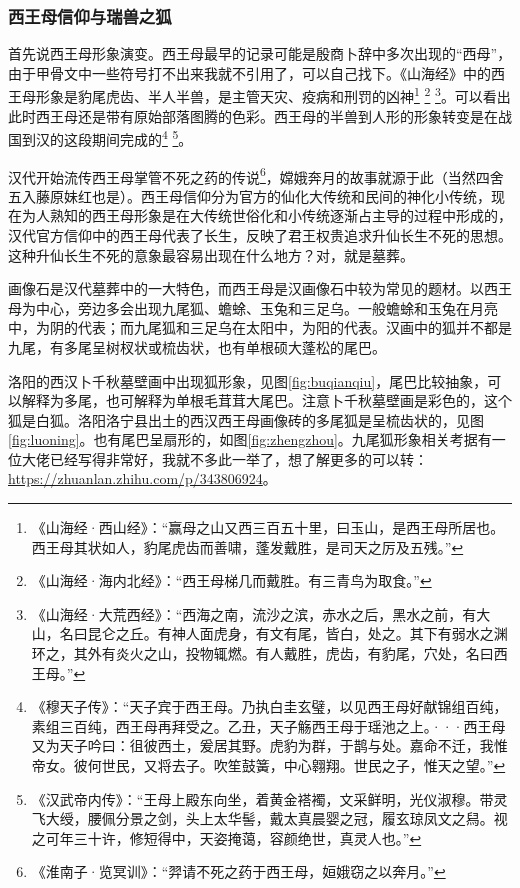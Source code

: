 \documentclass[UTF8, 12pt, A4paper]{article}
\begin{document}
\subsubsection{西王母信仰与瑞兽之狐}

首先说西王母形象演变。西王母最早的记录可能是殷商卜辞中多次出现的“西母”，由于甲骨文中一些符号打不出来我就不引用了，可以自己找下。《山海经》中的西王母形象是豹尾虎齿、半人半兽，是主管天灾、疫病和刑罚的凶神\footnote{《山海经·西山经》：“赢母之山又西三百五十里，曰玉山，是西王母所居也。西王母其状如人，豹尾虎齿而善啸，蓬发戴胜，是司天之厉及五残。”} \footnote{《山海经·海内北经》：“西王母梯几而戴胜。有三青鸟为取食。”} \footnote{《山海经·大荒西经》：“西海之南，流沙之滨，赤水之后，黑水之前，有大山，名曰昆仑之丘。有神人面虎身，有文有尾，皆白，处之。其下有弱水之渊环之，其外有炎火之山，投物辄燃。有人戴胜，虎齿，有豹尾，穴处，名曰西王母。”}。可以看出此时西王母还是带有原始部落图腾的色彩。西王母的半兽到人形的形象转变是在战国到汉的这段期间完成的\footnote{《穆天子传》：“天子宾于西王母。乃执白圭玄璧，以见西王母好献锦组百纯，素组三百纯，西王母再拜受之。乙丑，天子觞西王母于瑶池之上。···西王母又为天子吟曰：徂彼西土，爰居其野。虎豹为群，于鹊与处。嘉命不迁，我惟帝女。彼何世民，又将去子。吹笙鼓簧，中心翱翔。世民之子，惟天之望。”} \footnote{《汉武帝内传》：“王母上殿东向坐，着黄金褡襡，文采鲜明，光仪淑穆。带灵飞大绶，腰佩分景之剑，头上太华髻，戴太真晨婴之冠，履玄琼凤文之舄。视之可年三十许，修短得中，天姿掩蔼，容颜绝世，真灵人也。”}。

汉代开始流传西王母掌管不死之药的传说\footnote{《淮南子·览冥训》：“羿请不死之药于西王母，姮娥窃之以奔月。”}，嫦娥奔月的故事就源于此（当然四舍五入藤原妹红也是）。西王母信仰分为官方的仙化大传统和民间的神化小传统，现在为人熟知的西王母形象是在大传统世俗化和小传统逐渐占主导的过程中形成的，汉代官方信仰中的西王母代表了长生，反映了君王权贵追求升仙长生不死的思想。这种升仙长生不死的意象最容易出现在什么地方？对，就是墓葬。

画像石是汉代墓葬中的一大特色，而西王母是汉画像石中较为常见的题材。以西王母为中心，旁边多会出现九尾狐、蟾蜍、玉兔和三足乌。一般蟾蜍和玉兔在月亮中，为阴的代表；而九尾狐和三足乌在太阳中，为阳的代表。汉画中的狐并不都是九尾，有多尾呈树杈状或梳齿状，也有单根硕大蓬松的尾巴。

洛阳的西汉卜千秋墓壁画中出现狐形象，见图\ref{fig:buqianqiu}，尾巴比较抽象，可以解释为多尾，也可解释为单根毛茸茸大尾巴。注意卜千秋墓壁画是彩色的，这个狐是白狐。洛阳洛宁县出土的西汉西王母画像砖的多尾狐是呈梳齿状的，见图\ref{fig:luoning}。也有尾巴呈扇形的，如图\ref{fig:zhengzhou}。九尾狐形象相关考据有一位大佬已经写得非常好，我就不多此一举了，想了解更多的可以转：\url{https://zhuanlan.zhihu.com/p/343806924}。
\end{document}
